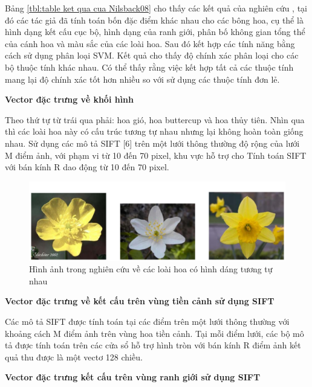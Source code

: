 \documentclass[12pt]{report}
\begin{document}
		Bảng \ref{tbl:table ket qua cua Nilsback08} cho thấy các kết quả của nghiên cứu \cite{cia-Nilsback08}, tại đó các tác giả đã tính toán bốn đặc điểm khác nhau cho các bông hoa, cụ thể là hình dạng kết cấu cục bộ, hình dạng của ranh giới, phân bố không gian tổng thể của cánh hoa và màu sắc của các loài hoa. Sau đó kết hợp các tính năng bằng cách sử dụng phân loại SVM. Kết quả cho thấy độ chính xác phân loại cho các bộ thuộc tính khác nhau. Có thể thấy rằng việc kết hợp tất cả các thuộc tính mang lại độ chính xác tốt hơn nhiều so với sử dụng các thuộc tính đơn lẻ.
																																				
		\textbf{Vector đặc trưng về khối hình}
																														
		Theo thứ tự từ trái qua phải: hoa gió, hoa buttercup và hoa thủy tiên. Nhìn qua thì các loài hoa này có cấu trúc tương tự nhau nhưng lại không hoàn toàn giống nhau. Sử dụng các mô tả SIFT [6] trên một lưới thông thường độ rộng của lưới M điểm ảnh, với phạm vi từ 10 đến 70 pixel, khu vực hỗ trợ cho Tính toán SIFT với bán kính R dao động từ 10 đến 70 pixel.				 
																																							
		\begin{figure}[h]
			\centering
			\includegraphics[scale=0.3]{anh_hoa_hinh_dang}
			\caption{Hình ảnh trong nghiên cứu \cite{cia-Nilsback06} về các loài hoa có hình dáng tương tự nhau}
			\label{fig:anh_hoa_hinh_dang}
		\end{figure}						 
																																										 
																																							
		\textbf{Vector đặc trưng về kết cấu trên vùng tiền cảnh sử dụng SIFT}	
																														
		Các mô tả SIFT được tính toán tại các điểm trên một lưới thông thường với khoảng cách M điểm ảnh trên vùng hoa tiền cảnh. Tại mỗi điểm lưới, các bộ mô tả được tính toán trên các cửa sổ hỗ trợ hình tròn với bán kính R điểm ảnh kết quả thu được là một vectơ 128 chiều.						 
																														
																																						 
		\textbf{Vector đặc trưng kết cấu trên vùng ranh giới sử dụng SIFT}												
																														
\end{document}

